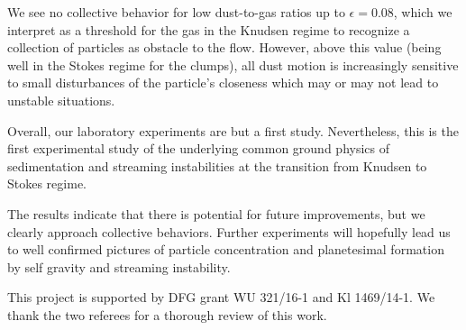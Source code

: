  
We see no collective behavior for low dust-to-gas ratios up to $\epsilon = 0.08$, which we interpret as a threshold for the gas in the Knudsen regime to 
recognize a collection of particles as obstacle to the flow.
However, above this value {(being well in the Stokes regime for the clumps)}, all dust motion is increasingly sensitive to small disturbances of the particle's closeness which
{may or may not lead to} unstable situations. 

Overall, our laboratory experiments are but a first study. Nevertheless, this 
is the first experimental study of the underlying common ground physics of sedimentation and streaming instabilities at the transition from Knudsen to Stokes regime.


The results indicate that there is potential for future improvements, but we clearly approach collective behaviors. Further experiments will hopefully lead us to well confirmed pictures of particle concentration and planetesimal formation by self gravity and streaming instability.
\begin{acknowledgements}
This project is supported by DFG grant WU 321/16-1 and Kl 1469/14-1.
We thank the two referees for a thorough review of this work.
\end{acknowledgements}



